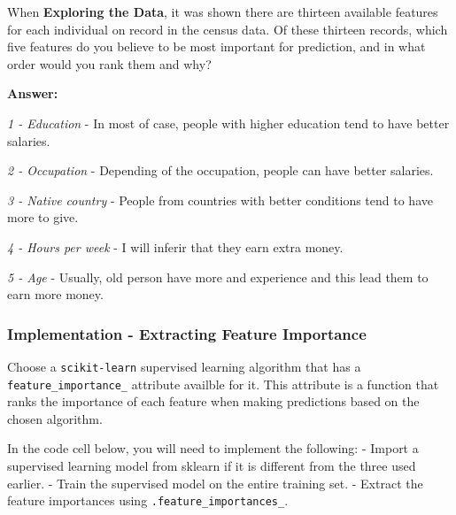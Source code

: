 \documentclass[11pt]{article}
\begin{document}
When \textbf{Exploring the Data}, it was shown there are thirteen
available features for each individual on record in the census data. Of
these thirteen records, which five features do you believe to be most
important for prediction, and in what order would you rank them and why?

    \textbf{Answer:}

\emph{1 - Education} - In most of case, people with higher education
tend to have better salaries.

\emph{2 - Occupation} - Depending of the occupation, people can have
better salaries.

\emph{3 - Native country} - People from countries with better conditions
tend to have more to give.

\emph{4 - Hours per week} - I will inferir that they earn extra money.

\emph{5 - Age} - Usually, old person have more and experience and this
lead them to earn more money.

    \subsubsection{Implementation - Extracting Feature
Importance}\label{implementation---extracting-feature-importance}

Choose a \texttt{scikit-learn} supervised learning algorithm that has a
\texttt{feature\_importance\_} attribute availble for it. This attribute
is a function that ranks the importance of each feature when making
predictions based on the chosen algorithm.

In the code cell below, you will need to implement the following: -
Import a supervised learning model from sklearn if it is different from
the three used earlier. - Train the supervised model on the entire
training set. - Extract the feature importances using
\texttt{\textquotesingle{}.feature\_importances\_\textquotesingle{}}.
\end{document}

